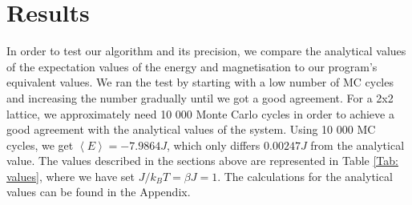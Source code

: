 \documentclass{article}
\begin{document}
\section{Results}
	In order to test our algorithm and its precision, we compare the analytical values of the expectation values of the energy and magnetisation to our program's equivalent values. We ran the test by starting with a low number of MC cycles and increasing the number gradually until we got a good agreement.
	For a 2x2 lattice, we approximately need 10 000 Monte Carlo cycles in order to achieve a good agreement with the analytical values of the system. Using 10 000 MC cycles, we get $\left<E\right> = -7.9864 J$, which only differs $0.00247 J$ from the analytical value. The values described in the sections above are represented in Table \ref{Tab: values}, where we have set $J/k_BT =\beta J = 1$. The calculations for the analytical values can be found in the Appendix.
\end{document}
